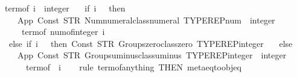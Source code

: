 \begin{isabellebody}
\ \ {\isachardoublequoteopen}term{\isacharunderscore}{\kern0pt}of\ {\isacharparenleft}{\kern0pt}i\ {\isacharcolon}{\kern0pt}{\isacharcolon}{\kern0pt}\ integer{\isacharparenright}{\kern0pt}\ {\isacharequal}{\kern0pt}\isanewline
\ \ {\isacharparenleft}{\kern0pt}if\ i\ {\isachargreater}{\kern0pt}\ {}\ then\ \isanewline
\ \ \ \ \ App\ {\isacharparenleft}{\kern0pt}Const\ {\isacharparenleft}{\kern0pt}STR\ {\isacharprime}{\kern0pt}{\isacharprime}{\kern0pt}Num{\isachardot}{\kern0pt}numeral{\isacharunderscore}{\kern0pt}class{\isachardot}{\kern0pt}numeral{\isacharprime}{\kern0pt}{\isacharprime}{\kern0pt}{\isacharparenright}{\kern0pt}\ {\isacharparenleft}{\kern0pt}TYPEREP{\isacharparenleft}{\kern0pt}num\ {\isasymRightarrow}\ integer{\isacharparenright}{\kern0pt}{\isacharparenright}{\kern0pt}{\isacharparenright}{\kern0pt}\isanewline
\ \ \ \ \ \ {\isacharparenleft}{\kern0pt}term{\isacharunderscore}{\kern0pt}of\ {\isacharparenleft}{\kern0pt}num{\isacharunderscore}{\kern0pt}of{\isacharunderscore}{\kern0pt}integer\ i{\isacharparenright}{\kern0pt}{\isacharparenright}{\kern0pt}\isanewline
\ \ \ else\ if\ i\ {\isacharequal}{\kern0pt}\ {}\ then\ Const\ {\isacharparenleft}{\kern0pt}STR\ {\isacharprime}{\kern0pt}{\isacharprime}{\kern0pt}Groups{\isachardot}{\kern0pt}zero{\isacharunderscore}{\kern0pt}class{\isachardot}{\kern0pt}zero{\isacharprime}{\kern0pt}{\isacharprime}{\kern0pt}{\isacharparenright}{\kern0pt}\ TYPEREP{\isacharparenleft}{\kern0pt}integer{\isacharparenright}{\kern0pt}\isanewline
\ \ \ else\isanewline
\ \ \ \ \ App\ {\isacharparenleft}{\kern0pt}Const\ {\isacharparenleft}{\kern0pt}STR\ {\isacharprime}{\kern0pt}{\isacharprime}{\kern0pt}Groups{\isachardot}{\kern0pt}uminus{\isacharunderscore}{\kern0pt}class{\isachardot}{\kern0pt}uminus{\isacharprime}{\kern0pt}{\isacharprime}{\kern0pt}{\isacharparenright}{\kern0pt}\ TYPEREP{\isacharparenleft}{\kern0pt}integer\ {\isasymRightarrow}\ integer{\isacharparenright}{\kern0pt}{\isacharparenright}{\kern0pt}\isanewline
\ \ \ \ \ \ \ {\isacharparenleft}{\kern0pt}term{\isacharunderscore}{\kern0pt}of\ {\isacharparenleft}{\kern0pt}{\isacharminus}{\kern0pt}\ i{\isacharparenright}{\kern0pt}{\isacharparenright}{\kern0pt}{\isacharparenright}{\kern0pt}{\isachardoublequoteclose}\isanewline
%
\isadelimproof
\ \ %
\endisadelimproof
%
\isatagproof
{}\isamarkupfalse%
\ {\isacharparenleft}{\kern0pt}rule\ term{\isacharunderscore}{\kern0pt}of{\isacharunderscore}{\kern0pt}anything\ {\isacharbrackleft}{\kern0pt}THEN\ meta{\isacharunderscore}{\kern0pt}eq{\isacharunderscore}{\kern0pt}to{\isacharunderscore}{\kern0pt}obj{\isacharunderscore}{\kern0pt}eq{\isacharbrackright}{\kern0pt}{\isacharparenright}{\kern0pt}%

\end{isabellebody}
